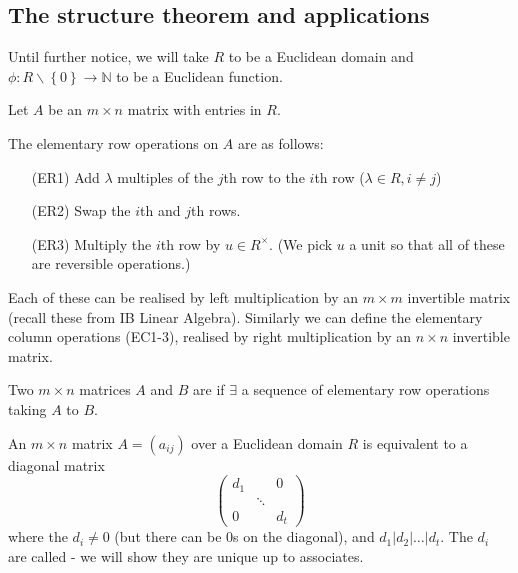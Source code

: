 \documentclass[egregdoesnotlikesansseriftitles,a4paper]{scrartcl}
\begin{document}
\subsection{The structure theorem and applications}
\begin{remark}
        Until further notice, we will take $R$ to be a Euclidean domain and $\phi: R \backslash \left\{0\right\} \rightarrow \mathbb{N}$ to be a Euclidean function.
\end{remark}
Let $A$ be an $m \times n$ matrix with entries in $R$. 
\begin{definition*}
        The elementary row operations on $A$ are as follows:
        \begin{itemize}
               \item[(ER1)] Add $\lambda$ multiples of the $j$th row to the $i$th row ($\lambda \in R, i \neq j$)
               \item[(ER2)] Swap the $i$th and $j$th rows.
               \item[(ER3)] Multiply the $i$th row by $u \in R^{\times}$. (We pick $u$ a unit so that all of these are reversible operations.)
        \end{itemize}
        Each of these can be realised by left multiplication by an $m \times m$ invertible matrix (recall these from IB Linear Algebra). Similarly we can define the elementary column operations (EC1-3), realised by right multiplication by an $n \times n$ invertible matrix.
\end{definition*}
\begin{definition*}
        Two $m \times n$ matrices $A$ and $B$ are  if $\exists $ a sequence of elementary row operations taking $A$ to $B$.
\end{definition*}
\begin{theorem}
        An $m \times n$ matrix $A= (a_{ij})$ over a Euclidean domain $R$ is equivalent to a diagonal matrix \[
        \begin{pmatrix} d_1 &&0\\ & \ddots &\\ 0&&d_t \end{pmatrix}
        \] where the $d_{i} \neq 0$ (but there can be 0s on the diagonal), and $d_1 | d_2 | \ldots| d_t$. The $d_{i}$ are called  - we will show they are unique up to associates.
\end{theorem}
\end{document}
